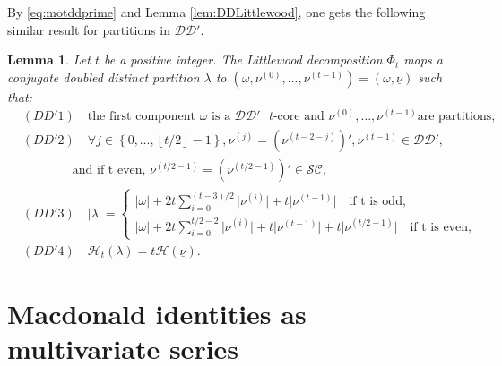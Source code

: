 \documentclass[11pt,letterpaper]{amsart}
\def\cch{\mathcal H}
\def\ccsc{\mathcal {SC}}
\def\ccdd{\mathcal {DD}}
\newtheorem{lm}[df]{Lemma}
\numberwithin{equation}{section}
\numberwithin{df}{section}
\begin{document}
By \eqref{eq:motddprime} and Lemma \ref{lem:DDLittlewood}, one gets the following similar result for partitions in $\ccdd'$.
\begin{lm}\label{lem:DDprimeLittlewood}
Let $t$ be a positive integer. The Littlewood decomposition $\Phi_t$ maps a conjugate doubled distinct partition $\lambda$ to $\left(\omega,\nu^{(0)},\dots,\nu^{(t-1)}\right)=(\omega,\underline{\nu})$ such that:
\begin{align*}
&(DD'1)\quad \text{the first component } \omega \text{ is a $\ccdd'$ $t$-core and }\nu^{(0)},\dots,\nu^{(t-1)} \text{are partitions},\\
&(DD'2) \quad \forall j \in \left\lbrace 0,\dots,\left\lfloor t/2 \right\rfloor-1\right\rbrace, \nu^{(j)}=\left(\nu^{(t-2-j)}\right)',\nu^{(t-1)}\in\ccdd',
\\&\quad \quad \quad \quad \text{and if t even, } \nu^{\left(t/2-1\right)}=\left(\nu^{\left(t/2-1\right)}\right)'\in\ccsc, \\
&(DD'3) \quad |\lambda|=\begin{cases}\displaystyle|\omega|+2t\sum_{i=0}^{(t-3)/2} \lvert\nu^{(i)}\rvert +t\lvert \nu^{(t-1)}\rvert\quad
 \text{if t is odd},\\
\displaystyle|\omega|+2t\sum_{i=0}^{t/2-2} \lvert\nu^{(i)}\rvert+t\lvert \nu^{(t-1)}\rvert+t\lvert \nu^{\left(t/2-1\right)}\rvert \quad \text{if t is even},
\end{cases}\\
&(DD'4)\quad \mathcal{H}_t(\lambda)=t\mathcal{H}(\underline{\nu}).
\end{align*}
\end{lm}

\section{Macdonald identities as multivariate series}\label{sec:Macdointer}
\end{document}
